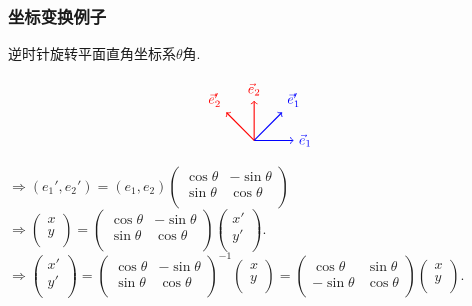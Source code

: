\begin{frame}\frametitle{坐标变换例子}

\begin{example}
逆时针旋转平面直角坐标系$\theta$角.
\end{example}
\pp
\begin{equation*}
\begin{tikzpicture}[scale=0.5]
\coordinate (O) at (0,0);
\coordinate (X) at (2,0);
\coordinate (Y) at (0,2);
\coordinate (a) at (1.414,1.414);
\coordinate (b) at (-1.414,1.414);
\draw[->,thick,blue](O)--(X) node[pos=1,right] {$\vec{e}_1$};
\draw[->,thick,red](O)--(Y) node[pos=1,above] {$\vec{e}_2$};
\draw[->,thick,blue](O)--(a) node[pos=1,above right] {$\vec{e}'_1$};
\draw[->,thick,red](O)--(b) node[pos=1,above left] {$\vec{e}'_2$};
\end{tikzpicture}
\end{equation*}
\pp
$\Rightarrow (e_1',e_2') = (e_1,e_2)\begin{pmatrix}
\cos\theta&-\sin\theta\\\sin\theta&\cos\theta\\
\end{pmatrix}$
\pp
$\Rightarrow \begin{pmatrix} x\\y\\\end{pmatrix}= \begin{pmatrix}
\cos\theta&-\sin\theta\\\sin\theta&\cos\theta\\
\end{pmatrix}\begin{pmatrix} x'\\y'\\\end{pmatrix}.$
\pp
$\Rightarrow
\begin{pmatrix} x'\\y'\\\end{pmatrix}
= \begin{pmatrix}
\cos\theta&-\sin\theta\\\sin\theta&\cos\theta\\
\end{pmatrix}^{-1} \begin{pmatrix} x\\y\\\end{pmatrix}= \begin{pmatrix}
\cos\theta&\sin\theta\\-\sin\theta&\cos\theta\\
\end{pmatrix} \begin{pmatrix} x\\y\\\end{pmatrix}.$
\end{frame}








